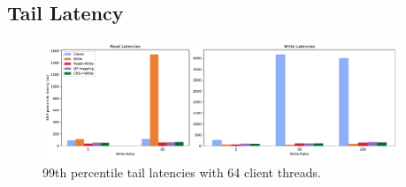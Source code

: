 
\subsection{Tail Latency}

\begin{figure}
    \includegraphics[width=0.95\textwidth]{fig/99th_latency.pdf}
    \caption{{99th percentile tail latencies with 64 client threads.}}
    \label{fig:tail_latency}
\end{figure}
